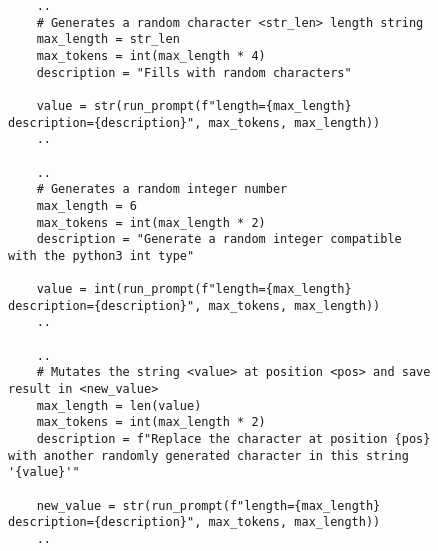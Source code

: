 
\begin{figure}[htbp]
    \centering
    \begin{verbatim}
    ..
    # Generates a random character <str_len> length string
    max_length = str_len
    max_tokens = int(max_length * 4)
    description = "Fills with random characters"

    value = str(run_prompt(f"length={max_length} description={description}", max_tokens, max_length))
    ..

    ..
    # Generates a random integer number
    max_length = 6
    max_tokens = int(max_length * 2)
    description = "Generate a random integer compatible with the python3 int type"

    value = int(run_prompt(f"length={max_length} description={description}", max_tokens, max_length))
    ..

    ..
    # Mutates the string <value> at position <pos> and save result in <new_value>
    max_length = len(value)
    max_tokens = int(max_length * 2)
    description = f"Replace the character at position {pos} with another randomly generated character in this string '{value}'"

    new_value = str(run_prompt(f"length={max_length} description={description}", max_tokens, max_length))
    ..
    \end{verbatim}
    \label{lis:code_prompt_mutate-2gen}
\end{figure}